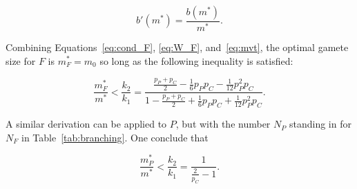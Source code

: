 \begin{equation}
  \label{eq:mvt}
  b'(m^*) = \frac{b(m^*)}{m^*} \mbox{.}
\end{equation}

\noindent Combining Equations~\ref{eq:cond_F}, \ref{eq:W_F}, and~\ref{eq:mvt}, the optimal gamete size for $F$ is $m_F^*=m_0$ so long as the following inequality is satisfied:

\begin{equation}
  \label{eq:inequa_F}
  \frac{m_F^*}{m^*} < \frac{k_2}{k_1} = \frac{\frac{p_P + p_C}{2} - \frac{1}{6} p_P p_C - \frac{1}{12} p_P^2 p_C }{ 1 - \frac{p_P + p_C}{2} + \frac{1}{6} p_P p_C + \frac{1}{12} p_P^2 p_C} \mbox{.}
\end{equation}








\noindent A similar derivation can be applied to $P$, but with the number $N_P$ standing in for $N_F$ in Table~\ref{tab:branching}. One conclude that

\begin{equation}
  \label{eq:inequa_P}
  \frac{m_P^*}{m^*} < \frac{k_2}{k_1} = \frac{1}{\frac{2}{p_C}-1} \mbox{.}
\end{equation}